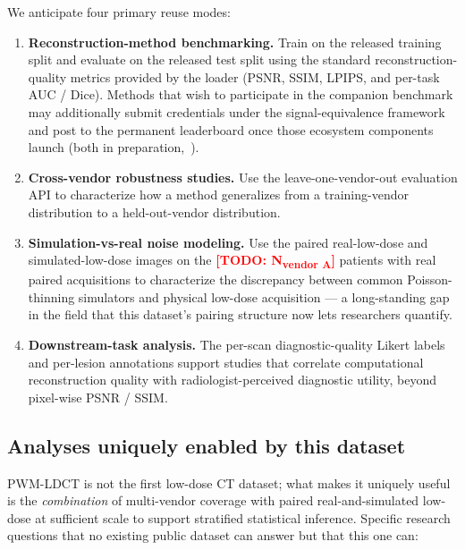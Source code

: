 \documentclass[twoside,11pt]{article}
\newcommand{\todo}[1]{\textcolor{red}{\textbf{[TODO: #1]}}}
\newcommand{\NvendorA}{\todo{N\textsubscript{vendor A}}}
\begin{document}
We anticipate four primary reuse modes:

\begin{enumerate}
    \item \textbf{Reconstruction-method benchmarking.} Train on the released training split and evaluate on the released test split using the standard reconstruction-quality metrics provided by the loader (PSNR, SSIM, LPIPS, and per-task AUC / Dice). Methods that wish to participate in the companion benchmark may additionally submit credentials under the signal-equivalence framework and post to the permanent leaderboard once those ecosystem components launch (both in preparation,~\citealt{ws2framework,ws4leaderboard}).
    \item \textbf{Cross-vendor robustness studies.} Use the leave-one-vendor-out evaluation API to characterize how a method generalizes from a training-vendor distribution to a held-out-vendor distribution.
    \item \textbf{Simulation-vs-real noise modeling.} Use the paired real-low-dose and simulated-low-dose images on the \NvendorA{} patients with real paired acquisitions to characterize the discrepancy between common Poisson-thinning simulators and physical low-dose acquisition --- a long-standing gap in the field that this dataset's pairing structure now lets researchers quantify.
    \item \textbf{Downstream-task analysis.} The per-scan diagnostic-quality Likert labels and per-lesion annotations support studies that correlate computational reconstruction quality with radiologist-perceived diagnostic utility, beyond pixel-wise PSNR / SSIM.
\end{enumerate}

\subsection*{Analyses uniquely enabled by this dataset}

PWM-LDCT is not the first low-dose CT dataset; what makes it uniquely useful is the \emph{combination} of multi-vendor coverage with paired real-and-simulated low-dose at sufficient scale to support stratified statistical inference. Specific research questions that no existing public dataset can answer but that this one can:
\end{document}
